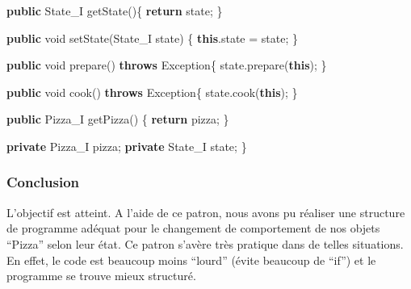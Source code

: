 \documentclass[french,]{article}
\newenvironment{Shaded}{}{}
\newcommand{\KeywordTok}[1]{\textcolor[rgb]{0.00,0.44,0.13}{\textbf{{#1}}}}
\newcommand{\DataTypeTok}[1]{\textcolor[rgb]{0.56,0.13,0.00}{{#1}}}
\newcommand{\FunctionTok}[1]{\textcolor[rgb]{0.02,0.16,0.49}{{#1}}}
\newcommand{\NormalTok}[1]{{#1}}
\begin{document}
\begin{Shaded}
\begin{Highlighting}[]
    \KeywordTok{public} \NormalTok{State_I }\FunctionTok{getState}\NormalTok{()\{}
        \KeywordTok{return} \NormalTok{state;}
    \NormalTok{\}}

    \KeywordTok{public} \DataTypeTok{void} \FunctionTok{setState}\NormalTok{(State_I state) \{}
        \KeywordTok{this}\NormalTok{.}\FunctionTok{state} \NormalTok{= state;}
    \NormalTok{\}}

    \KeywordTok{public} \DataTypeTok{void} \FunctionTok{prepare}\NormalTok{() }\KeywordTok{throws} \NormalTok{Exception\{}
        \NormalTok{state.}\FunctionTok{prepare}\NormalTok{(}\KeywordTok{this}\NormalTok{);}
    \NormalTok{\}}

    \KeywordTok{public} \DataTypeTok{void} \FunctionTok{cook}\NormalTok{() }\KeywordTok{throws} \NormalTok{Exception\{}
        \NormalTok{state.}\FunctionTok{cook}\NormalTok{(}\KeywordTok{this}\NormalTok{);}
    \NormalTok{\}}

    \KeywordTok{public} \NormalTok{Pizza_I }\FunctionTok{getPizza}\NormalTok{() \{}
        \KeywordTok{return} \NormalTok{pizza;}
    \NormalTok{\}}

    \KeywordTok{private} \NormalTok{Pizza_I pizza;}
    \KeywordTok{private} \NormalTok{State_I state;}
\NormalTok{\}}
\end{Highlighting}
\end{Shaded}

\subsubsection{Conclusion}\label{conclusion-1}

L'objectif est atteint. A l'aide de ce patron, nous avons pu réaliser
une structure de programme adéquat pour le changement de comportement de
nos objets ``Pizza'' selon leur état. Ce patron s'avère très pratique
dans de telles situations. En effet, le code est beaucoup moins
``lourd'' (évite beaucoup de ``if'') et le programme se trouve mieux
structuré.
\end{document}
